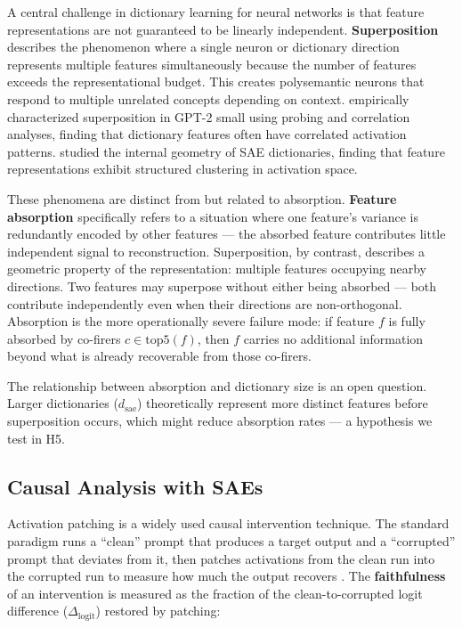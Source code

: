 \documentclass{article}
\begin{document}
A central challenge in dictionary learning for neural networks is that feature representations are not guaranteed to be linearly independent. \textbf{Superposition} \citep{Elhage2022} describes the phenomenon where a single neuron or dictionary direction represents multiple features simultaneously because the number of features exceeds the representational budget. This creates polysemantic neurons that respond to multiple unrelated concepts depending on context. \citet{Sharkey2023} empirically characterized superposition in GPT-2 small using probing and correlation analyses, finding that dictionary features often have correlated activation patterns. \citet{Templeton2025} studied the internal geometry of SAE dictionaries, finding that feature representations exhibit structured clustering in activation space.

These phenomena are distinct from but related to absorption. \textbf{Feature absorption} specifically refers to a situation where one feature's variance is redundantly encoded by other features --- the absorbed feature contributes little independent signal to reconstruction. Superposition, by contrast, describes a geometric property of the representation: multiple features occupying nearby directions. Two features may superpose without either being absorbed --- both contribute independently even when their directions are non-orthogonal. Absorption is the more operationally severe failure mode: if feature $f$ is fully absorbed by co-firers $c \in \text{top5}(f)$, then $f$ carries no additional information beyond what is already recoverable from those co-firers.

The relationship between absorption and dictionary size is an open question. Larger dictionaries ($d_{\text{sae}}$) theoretically represent more distinct features before superposition occurs, which might reduce absorption rates --- a hypothesis we test in H5.

\subsection{Causal Analysis with SAEs}

Activation patching is a widely used causal intervention technique. The standard paradigm runs a ``clean'' prompt that produces a target output and a ``corrupted'' prompt that deviates from it, then patches activations from the clean run into the corrupted run to measure how much the output recovers \citep{Wang2022, Meng2022}. The \textbf{faithfulness} of an intervention is measured as the fraction of the clean-to-corrupted logit difference ($\Delta_{\text{logit}}$) restored by patching:
\end{document}
